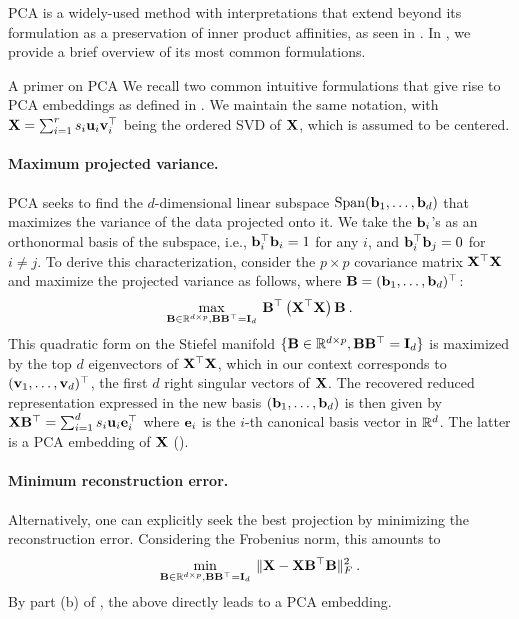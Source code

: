 PCA is a widely-used method with interpretations that extend beyond its formulation as a preservation of inner product affinities, as seen in . In , we provide a brief overview of its most common formulations.
	
\begin{mem1}{A primer on PCA}\label{memo:PCA}
	We recall two common intuitive formulations that give rise to PCA embeddings as defined in . We maintain the same notation, with ${\mathbf{X}} = \sum_{i=1}^{r} s_i {\mathbf{u}}_i {\mathbf{v}}_i^\top$ being the ordered SVD of ${\mathbf{X}}$, which is assumed to be centered.

	\paragraph{Maximum projected variance.} PCA seeks to find the $d$-dimensional linear subspace $\mathrm{Span}({\mathbf{b}}_1, \dots, {\mathbf{b}}_d)$ that maximizes the variance of the data projected onto it. We take the ${\mathbf{b}}_i$'s as an orthonormal basis of the subspace, i.e., ${\mathbf{b}}_i^\top {\mathbf{b}}_i = 1$ for any $i$, and ${\mathbf{b}}_i^\top {\mathbf{b}}_j = 0$ for $i \neq j$. 
	To derive this characterization, consider the $p \times p$ covariance matrix ${\mathbf{X}}^\top {\mathbf{X}}$ and maximize the projected variance as follows, where ${\mathbf{B}} = ({\mathbf{b}}_1, \dots, {\mathbf{b}}_d)^\top$:
	\begin{align}
	\max_{{\mathbf{B}} \in \mathbb{R}^{d \times p}, {\mathbf{B}} {\mathbf{B}}^\top = {\mathbf{I}}_d} \: {\mathbf{B}}^\top \left({\mathbf{X}}^\top {\mathbf{X}}\right) {\mathbf{B}} \:.
	\end{align}
	This quadratic form on the Stiefel manifold $\{{\mathbf{B}} \in \mathbb{R}^{d \times p}, {\mathbf{B}} {\mathbf{B}}^\top = {\mathbf{I}}_d \}$ is maximized by the top $d$ eigenvectors of ${\mathbf{X}}^\top {\mathbf{X}}$, which in our context corresponds to $({\mathbf{v}}_1, \dots, {\mathbf{v}}_d)^\top$, the first $d$ right singular vectors of ${\mathbf{X}}$. The recovered reduced representation expressed in the new basis $({\mathbf{b}}_1, \dots, {\mathbf{b}}_d)$ is then given by
	$
	{\mathbf{X}} {\mathbf{B}}^\top = \sum_{i=1}^{d} s_i {\mathbf{u}}_i {\mathbf{e}}_i^\top
	$
	where ${\mathbf{e}}_i$ is the $i$-th canonical basis vector in $\mathbb{R}^d$. The latter is a PCA embedding of ${\mathbf{X}}$ ().

	\paragraph{Minimum reconstruction error.} Alternatively, one can explicitly seek the best projection by minimizing the reconstruction error. Considering the Frobenius norm, this amounts to 
	\begin{align}
	\min_{{\mathbf{B}} \in \mathbb{R}^{d \times p}, {\mathbf{B}} {\mathbf{B}}^\top = {\mathbf{I}}_d} \: \| {\mathbf{X}} - {\mathbf{X}} {\mathbf{B}}^\top {\mathbf{B}} \|_F^2 \:.
	\end{align}
	By part (b) of , the above directly leads to a PCA embedding.

\end{mem1}


